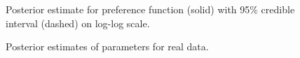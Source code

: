 \documentclass[
  sn-basic,
]{sn-jnl}
\theoremstyle{plain}
\theoremstyle{remark}
\begin{document}
\begin{figure}[H]


\caption{\label{fig-pa}Posterior estimate for preference function
(solid) with 95\% credible interval (dashed) on log-log scale.}

\end{figure}%

\begin{figure}[H]


\caption{\label{fig-rec3}Posterior estimates of parameters for real
data.}

\end{figure}%
\end{document}
